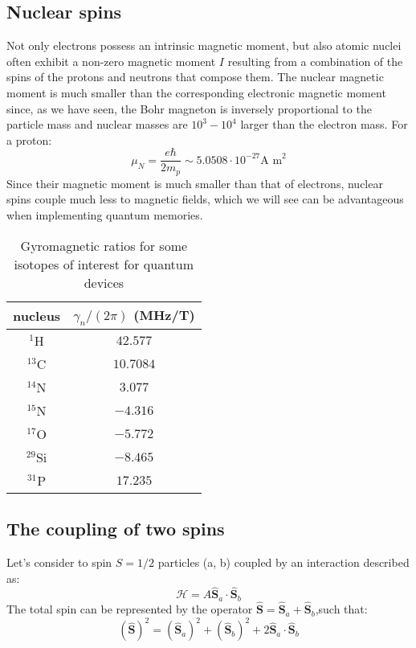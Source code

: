 \documentclass[a4paper,11pt]{article}
\begin{document}
\subsection {Nuclear spins}
Not only electrons possess an intrinsic magnetic moment, but also atomic nuclei often exhibit a non-zero magnetic moment $I$ resulting from a combination of the spins of the protons and neutrons that compose them. The nuclear magnetic moment is much smaller than the corresponding electronic magnetic moment since, as we have seen, the Bohr magneton is inversely proportional to the particle mass and nuclear masses are $10^3-10^4$ larger than the electron mass. For a proton:
\begin{equation}
    \mu_N = \frac{e \hbar}{2 m_p} \sim 5.0508 \cdot 10^{-27} \mbox{A m}^2
\end{equation}
Since their magnetic moment is much smaller than that of electrons, nuclear spins couple much less to magnetic fields, which we will see can be advantageous when implementing quantum memories.

\begin{table}[h]
\centering
\begin{tabular}{c | c }
nucleus & $\gamma_n/(2\pi)$ (MHz/T) \\
\hline
$^1$H & $42.577$  \\
$^{13}$C & $10.7084$  \\
$^{14}$N & $3.077$  \\
$^{15}$N & $-4.316$   \\
$^{17}$O & $-5.772$  \\
$^{29}$Si & $-8.465$  \\
$^{31}$P & $17.235$  
\end{tabular}
\caption{Gyromagnetic ratios for some isotopes of interest for quantum devices}
\label{tab:gamma_n}
\end{table}

\subsection{The coupling of two spins}
Let's consider to spin $S=1/2$ particles (a, b) coupled by an interaction described as:
\begin{equation}
    \mathcal{H} = A \mathbf{\hat{S}}_a \cdot \mathbf{\hat{S}}_b
\end{equation}
The total spin can be represented by the operator $ \mathbf{\hat{S}} = \mathbf{\hat{S}}_a + \mathbf{\hat{S}}_b$,such that:
\begin{equation}
    (\mathbf{\hat{S}})^2 = (\mathbf{\hat{S}}_a)^2 + (\mathbf{\hat{S}}_b)^2 + 2 \mathbf{\hat{S}}_a \cdot \mathbf{\hat{S}}_b
\end{equation}
\end{document}

